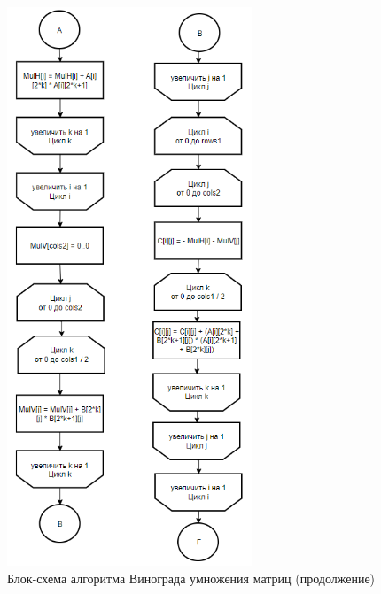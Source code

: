 \begin{figure}[H]
    \centering
    \includegraphics[width=0.65\textwidth]{img/block_2_2.png}
    \caption{Блок-схема алгоритма Винограда умножения матриц (продолжение)}
    \label{fig:block_2_2}
\end{figure}


